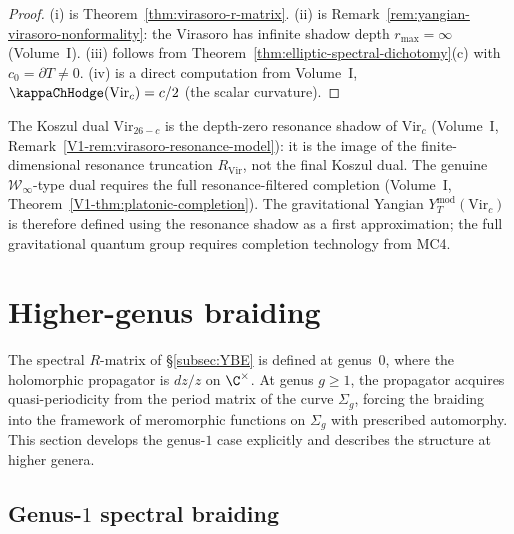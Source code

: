 \begin{proof}
(i) is Theorem~\ref{thm:virasoro-r-matrix}.
(ii) is Remark~\ref{rem:yangian-virasoro-nonformality}: the
Virasoro has infinite shadow depth $r_{\max} = \infty$ (Volume~I).
(iii) follows from Theorem~\ref{thm:elliptic-spectral-dichotomy}(c)
with $c_0 = \partial T \ne 0$.
(iv) is a direct computation from Volume~I,
$\kappaChHodge(\mathrm{Vir}_c) = c/2$ (the scalar curvature).
\end{proof}

\begin{remark}
The Koszul dual $\mathrm{Vir}_{26-c}$ is the depth-zero resonance
shadow of $\mathrm{Vir}_c$ (Volume~I,
Remark~\ref*{V1-rem:virasoro-resonance-model}): it is the image of
the finite-dimensional resonance truncation $R_{\mathrm{Vir}}$,
not the final Koszul dual. The genuine $\mathcal{W}_\infty$-type
dual requires the full resonance-filtered completion
(Volume~I, Theorem~\ref*{V1-thm:platonic-completion}). The
gravitational Yangian $Y_T^{\mathrm{mod}}(\mathrm{Vir}_c)$ is
therefore defined using the resonance shadow as a first
approximation; the full gravitational quantum group requires
completion technology from MC4.
\end{remark}



\section{Higher-genus braiding}

The spectral $R$-matrix of \S\ref{subsec:YBE} is defined at
genus~$0$, where the holomorphic propagator is $dz/z$ on $\C^\times$.
At genus $g \ge 1$, the propagator acquires quasi-periodicity from
the period matrix of the curve $\Sigma_g$, forcing the braiding
into the framework of meromorphic functions on $\Sigma_g$ with
prescribed automorphy. This section develops the genus-$1$ case
explicitly and describes the structure at higher genera.

\subsection{Genus-$1$ spectral braiding}

